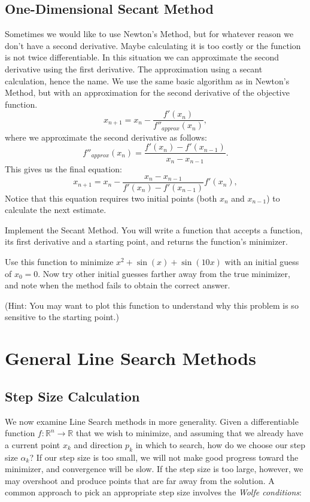 \subsection*{One-Dimensional Secant Method}
Sometimes we would like to use Newton's Method, but for whatever reason we don't have a second derivative.
Maybe calculating it is too costly or the function is not twice differentiable.
In this situation we can approximate the second derivative using the first derivative.
The approximation using a secant calculation, hence the name.
We use the same basic algorithm as in Newton's Method, but with an approximation for the second derivative of the objective function.
\begin{equation*}
x_{n+1} = x_n - \frac{f'(x_n)}{f''_{approx}(x_n)},
\end{equation*}
where we approximate the second derivative as follows:
\begin{equation*}
f''_{approx}(x_n) = \frac{f'(x_n) - f'(x_{n-1})}{x_n - x_{n-1}}.
\end{equation*}
This gives us the final equation:
\begin{equation*}
x_{n+1} = x_n - \frac{x_n - x_{n-1}}{f'(x_n) - f'(x_{n-1})}f'(x_n),
\end{equation*}
Notice that this equation requires two initial points (both $x_n$ and $x_{n-1}$) to calculate the next estimate.

\begin{problem}
Implement the Secant Method.
You will write a function that accepts a function, its first derivative and a starting point, and returns the function's minimizer.

Use this function to minimize $x^2 + \sin(x) + \sin(10x)$ with an initial guess of $x_0 = 0$.
Now try other initial guesses farther away from the true minimizer, and note when the method fails to obtain the correct answer.

(Hint: You may want to plot this function to understand why this problem is so sensitive to the starting point.)
\end{problem}

\section*{General Line Search Methods}
\subsection*{Step Size Calculation}
We now examine Line Search methods in more generality.
Given a differentiable function $f : \mathbb{R}^n \rightarrow \mathbb{R}$ that we wish to minimize, and assuming that we already have a current point $x_k$ and direction $p_k$ in which to search, how do we choose our step size $\alpha_k$? If our step size is too small, we will not make good progress toward the minimizer, and convergence will be slow.
If the step size is too large, however, we may overshoot and produce points that are far away from the solution.
A common approach to pick an appropriate step size involves the \emph{Wolfe conditions}:

